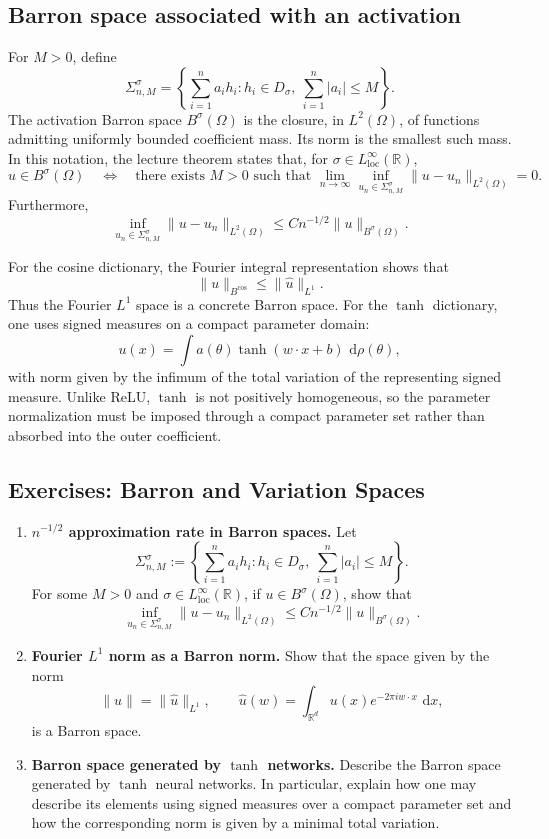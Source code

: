 \documentclass[11pt,a4paper]{article}
\newcommand{\R}{\mathbb{R}}
\newcommand{\dd}{\,\mathrm{d}}
\theoremstyle{definition}
\theoremstyle{plain}
\theoremstyle{remark}
\theoremstyle{plain}
\begin{document}
\subsection{Barron space associated with an activation}
For $M>0$, define
\[
  \Sigma_{n,M}^\sigma
  =\left\{\sum_{i=1}^na_ih_i:
  h_i\in D_\sigma,
  \ \sum_{i=1}^n|a_i|\le M\right\}.
\]
The activation Barron space $B^\sigma(\Omega)$ is the closure, in $L^2(\Omega)$, of functions admitting uniformly bounded coefficient mass. Its norm is the smallest such mass. In this notation, the lecture theorem states that, for $\sigma\in L^\infty_{\mathrm{loc}}(\R)$,
\[
  u\in B^\sigma(\Omega)
  \quad\Longleftrightarrow\quad
  \text{there exists }M>0\text{ such that }
  \lim_{n\to\infty}
  \inf_{u_n\in\Sigma_{n,M}^\sigma}
  \|u-u_n\|_{L^2(\Omega)}=0.
\]
Furthermore,
\[
  \inf_{u_n\in\Sigma_{n,M}^\sigma}
  \|u-u_n\|_{L^2(\Omega)}
  \le Cn^{-1/2}\|u\|_{B^\sigma(\Omega)}.
\]

For the cosine dictionary, the Fourier integral representation shows that
\[
  \|u\|_{B^{\cos}}\le \|\widehat u\|_{L^1}.
\]
Thus the Fourier $L^1$ space is a concrete Barron space. For the $\tanh$ dictionary, one uses signed measures on a compact parameter domain:
\[
  u(x)=\int a(\theta)\tanh(w\cdot x+b)\,\dd\rho(\theta),
\]
with norm given by the infimum of the total variation of the representing signed measure. Unlike ReLU, $\tanh$ is not positively homogeneous, so the parameter normalization must be imposed through a compact parameter set rather than absorbed into the outer coefficient.



\subsection*{Exercises: Barron and Variation Spaces}
\begin{enumerate}[label=\textbf{Exercise \arabic*.},leftmargin=2.6em]
  \item \textbf{$n^{-1/2}$ approximation rate in Barron spaces.}
  Let
  \[
    \Sigma_{n,M}^\sigma
    :=\left\{
      \sum_{i=1}^n a_i h_i:
      h_i\in D_\sigma,
      \ \sum_{i=1}^n |a_i|\le M
    \right\}.
  \]
  For some $M>0$ and $\sigma\in L^\infty_{\mathrm{loc}}(\mathbb R)$, if $u\in B^\sigma(\Omega)$, show that
  \[
    \inf_{u_n\in\Sigma_{n,M}^\sigma}
    \|u-u_n\|_{L^2(\Omega)}
    \le Cn^{-1/2}\|u\|_{B^\sigma(\Omega)}.
  \]

  \item \textbf{Fourier $L^1$ norm as a Barron norm.}
  Show that the space given by the norm
  \[
    \|u\|=\|\widehat u\|_{L^1},
    \qquad
    \widehat u(w)=\int_{\mathbb R^d}u(x)e^{-2\pi i w\cdot x}\,\dd x,
  \]
  is a Barron space.

  \item \textbf{Barron space generated by $\tanh$ networks.}
  Describe the Barron space generated by $\tanh$ neural networks. In particular, explain how one may describe its elements using signed measures over a compact parameter set and how the corresponding norm is given by a minimal total variation.
\end{enumerate}
\end{document}
